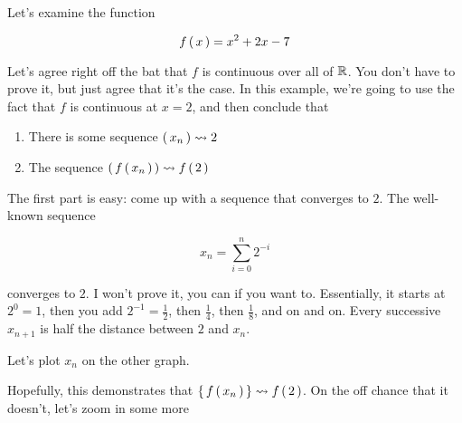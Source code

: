 \begin{example}
  Let's examine the function

  \begin{equation}
    f \left(\, x \,\right) = x^2 + 2x - 7
  \end{equation}


  Let's agree right off the bat that $f$ is continuous over all of $\mathbb{R}$. You
  don't have to prove it, but just agree that it's the case. In this example,
  we're going to use the fact that $f$ is continuous at $x = 2$, and then
  conclude that

  \begin{enumerate}
  \item There is some sequence $\left(\, x_n \,\right) \leadsto 2$
  \item The sequence $\left(\, f \left(\, x_n \,\right) \,\right) \leadsto f \left(\, 2 \,\right)$
  \end{enumerate}

  The first part is easy: come up with a sequence that converges to $2$. The
  well-known sequence

  \begin{equation}
    x_n = \sum_{i = 0}^n 2^{-i}
  \end{equation}

  converges to $2$. I won't prove it, you can if you want to. Essentially, it
  starts at $2^0 = 1$, then you add $2^{-1} = \frac{1}{2}$, then $\frac{1}{4}$,
  then $\frac{1}{8}$, and on and on. Every successive $x_{n+1}$ is half the
  distance between $2$ and $x_n$.


  Let's plot $x_n$ on the other graph.


  Hopefully, this demonstrates that $\left\{\, f \left(\, x_n \,\right) \,\right\} \leadsto
  f \left(\, 2 \,\right)$. On the off chance that it doesn't, let's zoom in some more

  
\end{example}